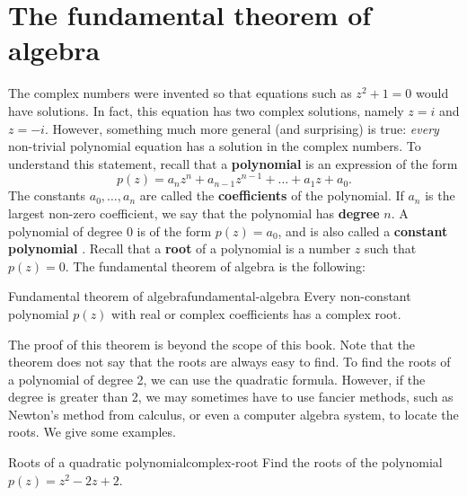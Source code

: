 \section{The fundamental theorem of algebra}

The complex numbers were invented so that equations such as $z^2+1=0$
would have solutions. In fact, this equation has two complex
solutions, namely $z=i$ and $z=-i$. However, something much more
general (and surprising) is true: {\em every} non-trivial polynomial
equation has a solution in the complex numbers. To understand this
statement, recall that a \textbf{polynomial}%
 is an expression of the form
\begin{equation*}
  p(z) = a_nz^n + a_{n-1}z^{n-1} + \ldots + a_1z + a_0.
\end{equation*}
The constants $a_0,\ldots,a_n$ are called the \textbf{coefficients}%
%
 of the polynomial. If $a_n$ is the
largest non-zero coefficient, we say that the polynomial has
\textbf{degree}%
%
 $n$. A polynomial of degree $0$ is of the
form $p(z) = a_0$, and is also called a \textbf{constant polynomial}%
%
. Recall that a \textbf{root}%
%
 of a polynomial is a number $z$ such that
$p(z)=0$.  The fundamental theorem of algebra is the following:

\begin{theorem}{Fundamental theorem of algebra}{fundamental-algebra}
  Every non-constant polynomial $p(z)$ with real or complex
  coefficients has a complex root.
\end{theorem}

The proof of this theorem is beyond the scope of this book. Note that
the theorem does not say that the roots are always easy to find. To
find the roots of a polynomial of degree 2, we can use the quadratic
formula. However, if the degree is greater than 2, we may sometimes
have to use fancier methods, such as Newton's method from calculus, or
even a computer algebra system, to locate the roots. We give some
examples.

\begin{example}{Roots of a quadratic polynomial}{complex-root}
  Find the roots of the polynomial $p(z) = z^2 - 2z + 2$.
\end{example}

